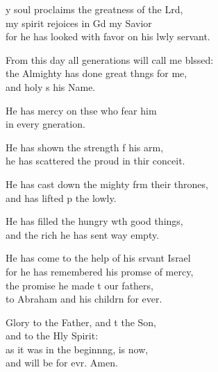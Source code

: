 \settowidth{\versewidth}{From this day all generations will call me blessed: +}
\begin{psalmverse}%
  \begin{patverse}
y soul proclaims the greatness of the Lrd,\Flex\\
my spirit rejoices in Gd my Savior\Med\\
for he has looked with favor on his lwly servant.

From this day all generations will call me blssed:\Flex\\
the Almighty has done great th\pointup{\i}ngs for me,\Med\\
and holy \pointup{\i}s his Name.

He has mercy on thse who fear him\Med\\
in every gneration.

He has shown the strength f his arm,\Med\\
he has scattered the proud in thir conceit.

He has cast down the mighty frm their thrones,\Med\\
and has lifted p the lowly.

He has filled the hungry w\pointup{\i}th good things,\Med\\
and the rich he has sent way empty.

He has come to the help of his srvant Israel\Med\\
for he has remembered his prom\pointup{\i}se of mercy,\\
the promise he made t our fathers,\Med\\
to Abraham and his childrn for ever.

Glory to the Father, and t the Son,\Med\\
and to the Hly Spirit:\\
as it was in the beginn\pointup{\i}ng, is now,\Med\\
and will be for evr. Amen.
  \end{patverse}
\end{psalmverse}
